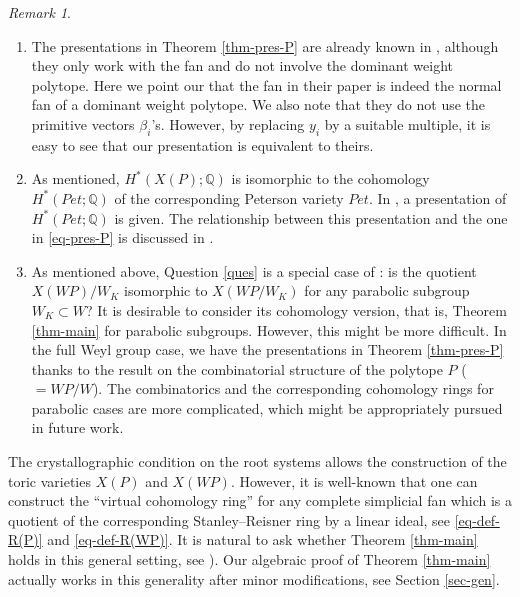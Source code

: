 \documentclass{amsart}
\theoremstyle{definition}
\theoremstyle{remark}
\newtheorem{remark}[theorem]{Remark}
\numberwithin{equation}{section}
\begin{document}
\begin{remark} \leavevmode
  \begin{enumerate}
      \item The presentations in Theorem \ref{thm-pres-P} are already known in \cite[section~6.5]{abe2023peterson}, although they only work with the fan and do not involve the dominant weight polytope. Here we point our that the fan in their paper is indeed the normal fan of a dominant weight polytope. We also note that they do not use the primitive vectors $\beta_i$'s. However, by replacing $y_i$ by a suitable multiple, it is easy to see that our presentation is equivalent to theirs.
      \item As mentioned, $H^*(X(P) ; \mathbb{Q})$ is isomorphic to the cohomology $H^*(\mathit{Pet} ; \mathbb{Q})$ of the corresponding Peterson variety $\mathit{Pet}$.
    In \cite{HHM15}, a presentation of $H^*(\mathit{Pet} ; \mathbb{Q})$ is given. 
    The relationship between this presentation and the one in \eqref{eq-pres-P} is discussed in \cite[section~6.5]{abe2023peterson}.
      \item As mentioned above, Question \ref{ques} is a special case of \cite[Question 8.3]{HMSS21-toric-orbifolds}: is the quotient $X(\mathit{WP}) / W_K$ isomorphic to $X(\mathit{WP}/W_K)$ for any parabolic subgroup $W_K \subset W$?
        It is desirable to consider its cohomology version, that is, Theorem \ref{thm-main} for parabolic subgroups.
        However, this might be more difficult. 
        In the full Weyl group case, we have the presentations in Theorem \ref{thm-pres-P} thanks to the result \cite{BGHpolytope} on the combinatorial structure of the polytope $P$ ($=\mathit{WP} / W$). 
        The combinatorics and the corresponding cohomology rings for parabolic cases are more complicated, which might be appropriately pursued in future work.
  \end{enumerate}
\end{remark}

The crystallographic condition on the root systems allows the construction of the toric varieties $X(P)$ and $X(\mathit{WP})$. However, it is well-known that one can construct the ``virtual cohomology ring'' for any complete simplicial fan which is a quotient of the corresponding Stanley--Reisner ring by a linear ideal, see \eqref{eq-def-R(P)} and \eqref{eq-def-R(WP)}. It is natural to ask whether Theorem \ref{thm-main} holds in this general setting, see \cite[Question 8.2]{HMSS21-toric-orbifolds}). Our algebraic proof of Theorem \ref{thm-main} actually works in this generality after minor modifications, see Section \ref{sec-gen}.
\end{document}
